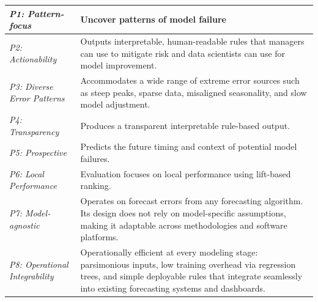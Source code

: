 \documentclass[12pt]{article}
\let\oldtable\table
\let\endoldtable\endtable
\renewenvironment{table}
  {\oldtable\spacingset{1}}
  {\endoldtable}
\begin{document}
\begin{table}
\centering
\caption{\textit{How TreeAlert Embodies the Design Principles for Pattern-Based Error Prediction}}
\small
\begin{tabular}{|m{3cm}|m{12.4cm}|}
\hline
\centering\textit{P1: Pattern-focus} &
Uncover patterns of model failure \\
\hline
\centering\textit{P2: Actionability} &
Outputs interpretable, human-readable rules that managers can use to mitigate risk and data scientists can use for model improvement. \\
\hline
\centering\textit{P3: Diverse Error Patterns} &
Accommodates a wide range of extreme error sources such as steep peaks, sparse data, misaligned seasonality, and slow model adjustment. \\
\hline
\centering\textit{P4: Transparency} &
Produces a transparent interpretable rule-based output. \\
\hline
\centering\textit{P5: Prospective} &
Predicts the future timing and context of potential model failures. \\
\hline
\centering\textit{P6: Local Performance} &
Evaluation focuses on local performance using lift-based ranking. \\
\hline
\centering\textit{P7: Model-agnostic} &
Operates on forecast errors from any forecasting algorithm. Its design does not rely on model-specific assumptions, making it adaptable across methodologies and software platforms. \\
\hline
\centering\textit{P8: Operational Integrability} &
Operationally efficient at every modeling stage: parsimonious inputs, low training overhead via regression trees, and simple deployable rules that integrate seamlessly into existing forecasting systems and dashboards. \\
\hline
\end{tabular}
\label{tab:design}
\end{table}

{


}
\end{document}
